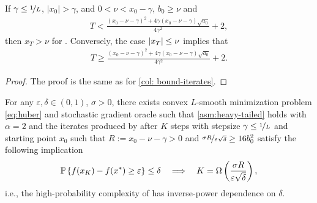 \documentclass{article}
\begin{document}
\begin{corollary}
\label{col: bound-iterates-delay}
    If $\gamma \leq \nicefrac{1}{L}$, $|x_0| > \gamma$, and $0 < \nu < x_0 - \gamma$, $b_0 \geq \nu$ and
    \begin{align*}
        T < \frac{(x_0 - \nu - \gamma)^2 + 4\gamma(x_0 - \nu - \gamma)\sqrt{a_0}}{4\gamma^2} + 2, 
    \end{align*}
    then $x_T > \nu$ for  . Conversely, the case $\left\lvert x_{T}\right\rvert \leq \nu$ implies that 
    \begin{align*}
        T \geq \frac{(x_0 - \nu - \gamma)^2 + 4\gamma(x_0 - \nu - \gamma)\sqrt{a_0}}{4\gamma^2} + 2.
    \end{align*}
\end{corollary}
\begin{proof}
    The proof is the same as for \cref{col: bound-iterates}.
\end{proof}
\begin{theorem}
    \label{thm:adagrad-delay-bad}
    For any $\varepsilon, \delta \in (0, 1)$, $\sigma > 0$, there exists convex $L$-smooth minimization problem \eqref{eq:huber} and stochastic gradient oracle such that \cref{asm:heavy-tailed} holds with $\alpha = 2$ and the iterates produced by  after $K$ steps with stepsize $\gamma \leq \nicefrac{1}{L}$ and starting point $x_0$ such that $R:= x_0 - \nu - \gamma > 0$ and $\nicefrac{\sigma R}{\varepsilon\sqrt{\delta}} \geq 16 b_0^2$ satisfy the following implication
    \begin{align}
        {\mathbb P}\left\{f(x_K) - f(x^*) \geq \varepsilon\right\} \leq \delta \quad \Longrightarrow \quad K = \Omega\left(\frac{\sigma R}{\varepsilon\sqrt{\delta}}\right), \label{eq:inverse_power_dependence_adagradd}
    \end{align}
    i.e., the high-probability complexity of  has inverse-power dependence on $\delta$.
\end{theorem}
\end{document}
